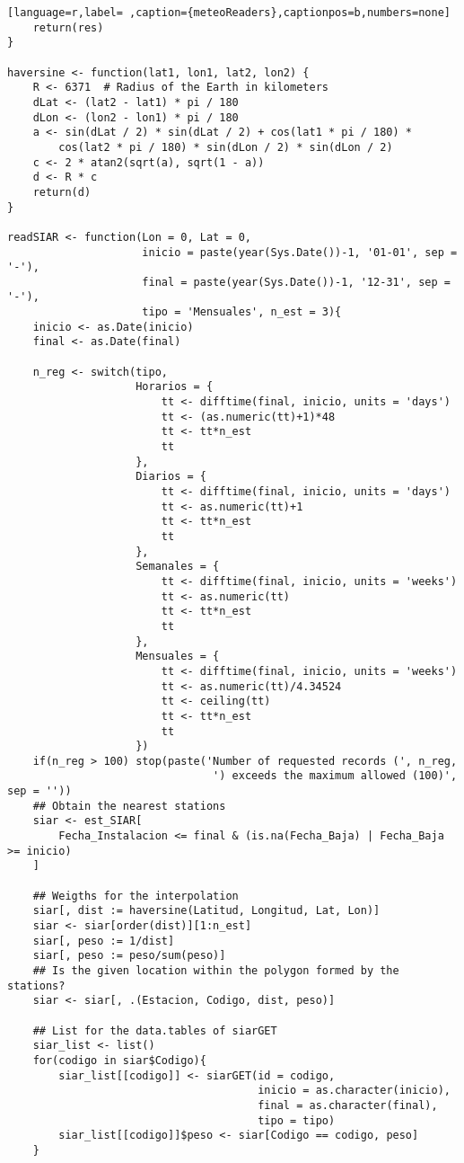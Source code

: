 \begin{lstlisting}[language=r,label= ,caption={meteoReaders},captionpos=b,numbers=none]
    return(res)
}

haversine <- function(lat1, lon1, lat2, lon2) {
    R <- 6371  # Radius of the Earth in kilometers
    dLat <- (lat2 - lat1) * pi / 180
    dLon <- (lon2 - lon1) * pi / 180
    a <- sin(dLat / 2) * sin(dLat / 2) + cos(lat1 * pi / 180) *
        cos(lat2 * pi / 180) * sin(dLon / 2) * sin(dLon / 2)
    c <- 2 * atan2(sqrt(a), sqrt(1 - a))
    d <- R * c
    return(d)
}

readSIAR <- function(Lon = 0, Lat = 0,
                     inicio = paste(year(Sys.Date())-1, '01-01', sep = '-'),
                     final = paste(year(Sys.Date())-1, '12-31', sep = '-'),
                     tipo = 'Mensuales', n_est = 3){
    inicio <- as.Date(inicio)
    final <- as.Date(final)

    n_reg <- switch(tipo,
                    Horarios = {
                        tt <- difftime(final, inicio, units = 'days')
                        tt <- (as.numeric(tt)+1)*48
                        tt <- tt*n_est
                        tt
                    },
                    Diarios = {
                        tt <- difftime(final, inicio, units = 'days')
                        tt <- as.numeric(tt)+1
                        tt <- tt*n_est
                        tt
                    },
                    Semanales = {
                        tt <- difftime(final, inicio, units = 'weeks')
                        tt <- as.numeric(tt)
                        tt <- tt*n_est
                        tt
                    },
                    Mensuales = {
                        tt <- difftime(final, inicio, units = 'weeks')
                        tt <- as.numeric(tt)/4.34524
                        tt <- ceiling(tt)
                        tt <- tt*n_est
                        tt
                    })
    if(n_reg > 100) stop(paste('Number of requested records (', n_reg,
                                ') exceeds the maximum allowed (100)', sep = ''))
    ## Obtain the nearest stations
    siar <- est_SIAR[
        Fecha_Instalacion <= final & (is.na(Fecha_Baja) | Fecha_Baja >= inicio)
    ]

    ## Weigths for the interpolation
    siar[, dist := haversine(Latitud, Longitud, Lat, Lon)]
    siar <- siar[order(dist)][1:n_est]
    siar[, peso := 1/dist]
    siar[, peso := peso/sum(peso)]
    ## Is the given location within the polygon formed by the stations?
    siar <- siar[, .(Estacion, Codigo, dist, peso)]

    ## List for the data.tables of siarGET
    siar_list <- list()
    for(codigo in siar$Codigo){
        siar_list[[codigo]] <- siarGET(id = codigo,
                                       inicio = as.character(inicio),
                                       final = as.character(final),
                                       tipo = tipo)
        siar_list[[codigo]]$peso <- siar[Codigo == codigo, peso]
    }


\end{lstlisting}

